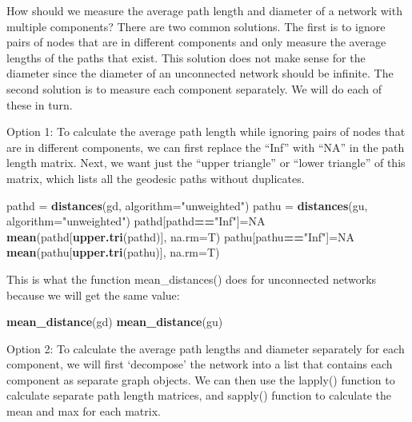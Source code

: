 \documentclass[
]{article}
\newenvironment{Shaded}{\begin{snugshade}}{\end{snugshade}}
\newcommand{\AttributeTok}[1]{\textcolor[rgb]{0.13,0.29,0.53}{#1}}
\newcommand{\ConstantTok}[1]{\textcolor[rgb]{0.56,0.35,0.01}{#1}}
\newcommand{\FunctionTok}[1]{\textcolor[rgb]{0.13,0.29,0.53}{\textbf{#1}}}
\newcommand{\NormalTok}[1]{#1}
\newcommand{\OtherTok}[1]{\textcolor[rgb]{0.56,0.35,0.01}{#1}}
\newcommand{\SpecialCharTok}[1]{\textcolor[rgb]{0.81,0.36,0.00}{\textbf{#1}}}
\newcommand{\StringTok}[1]{\textcolor[rgb]{0.31,0.60,0.02}{#1}}
\begin{document}
How should we measure the average path length and diameter of a network with multiple components? There are two common solutions. The first is to ignore pairs of nodes that are in different components and only measure the average lengths of the paths that exist. This solution does not make sense for the diameter since the diameter of an unconnected network should be infinite. The second solution is to measure each component separately. We will do each of these in turn.

Option 1: To calculate the average path length while ignoring pairs of nodes that are in different components, we can first replace the ``Inf'' with ``NA'' in the path length matrix. Next, we want just the ``upper triangle'' or ``lower triangle'' of this matrix, which lists all the geodesic paths without duplicates.

\footnotesize

\begin{Shaded}
\begin{Highlighting}[]
\NormalTok{pathd }\OtherTok{=} \FunctionTok{distances}\NormalTok{(gd, }\AttributeTok{algorithm=}\StringTok{"unweighted"}\NormalTok{)}
\NormalTok{pathu }\OtherTok{=} \FunctionTok{distances}\NormalTok{(gu, }\AttributeTok{algorithm=}\StringTok{"unweighted"}\NormalTok{)}
\NormalTok{pathd[pathd}\SpecialCharTok{==}\StringTok{"Inf"}\NormalTok{]}\OtherTok{=}\ConstantTok{NA}
\FunctionTok{mean}\NormalTok{(pathd[}\FunctionTok{upper.tri}\NormalTok{(pathd)], }\AttributeTok{na.rm=}\NormalTok{T)}
\NormalTok{pathu[pathu}\SpecialCharTok{==}\StringTok{"Inf"}\NormalTok{]}\OtherTok{=}\ConstantTok{NA}
\FunctionTok{mean}\NormalTok{(pathu[}\FunctionTok{upper.tri}\NormalTok{(pathu)], }\AttributeTok{na.rm=}\NormalTok{T)}
\end{Highlighting}
\end{Shaded}

\normalsize

This is what the function mean\_distances() does for unconnected networks because we will get the same value:

\footnotesize

\begin{Shaded}
\begin{Highlighting}[]
\FunctionTok{mean\_distance}\NormalTok{(gd)}
\FunctionTok{mean\_distance}\NormalTok{(gu)}
\end{Highlighting}
\end{Shaded}

\normalsize

Option 2: To calculate the average path lengths and diameter separately for each component, we will first `decompose' the network into a list that contains each component as separate graph objects. We can then use the lapply() function to calculate separate path length matrices, and sapply() function to calculate the mean and max for each matrix.
\end{document}

